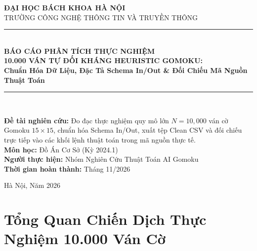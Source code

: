 \documentclass[11pt,a4paper]{article}
\begin{document}
\begin{titlepage}
\centering
\vspace*{1.0cm}
{\Large\bfseries ĐẠI HỌC BÁCH KHOA HÀ NỘI}\\[0.3cm]
{\large TRƯỜNG CÔNG NGHỆ THÔNG TIN VÀ TRUYỀN THÔNG}\\[2.0cm]

\rule{\textwidth}{1.5pt}\\[0.4cm]
{\huge\bfseries BÁO CÁO PHÂN TÍCH THỰC NGHIỆM}\\[0.3cm]
{\LARGE\bfseries 10.000 VÁN TỰ ĐỐI KHÁNG HEURISTIC GOMOKU:}\\[0.2cm]
{\Large\bfseries Chuẩn Hóa Dữ Liệu, Đặc Tả Schema In/Out \& Đối Chiếu Mã Nguồn Thuật Toán}\\[0.4cm]
\rule{\textwidth}{1.5pt}\\[1.5cm]

\begin{minipage}{0.85\textwidth}
\begin{center}
\textbf{Đề tài nghiên cứu:} Đo đạc thực nghiệm quy mô lớn $N = 10{,}000$ ván cờ Gomoku $15 \times 15$, chuẩn hóa Schema In/Out, xuất tệp Clean CSV và đối chiếu trực tiếp vào các khối lệnh thuật toán trong mã nguồn thực tế.\\
\vspace{0.4cm}
\textbf{Môn học:} Đồ Án Cơ Sở (Kỳ 2024.1)\\
\textbf{Người thực hiện:} Nhóm Nghiên Cứu Thuật Toán AI Gomoku\\
\textbf{Thời gian hoàn thành:} Tháng 11/2026
\end{center}
\end{minipage}

\vfill
{\small Hà Nội, Năm 2026}
\end{titlepage}

\tableofcontents
\clearpage
{}

\section{Tổng Quan Chiến Dịch Thực Nghiệm 10.000 Ván Cờ}
\end{document}
